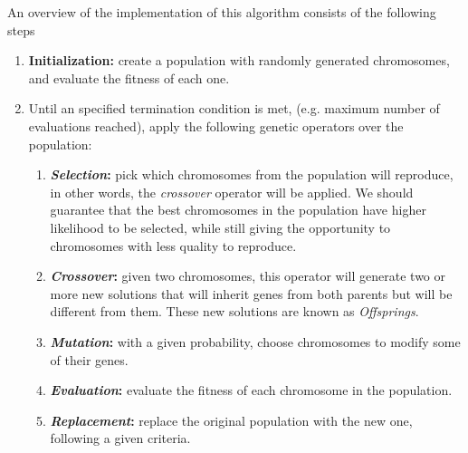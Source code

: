 An overview of the implementation of this algorithm consists of the following steps

\begin{enumerate}
    \item \textbf{Initialization:} create a population with randomly generated chromosomes, and evaluate the fitness of each one.
    
    \item Until an specified termination condition is met, (e.g. maximum number of evaluations reached), apply the following genetic operators over the population:
    
    \begin{enumerate}
        \item \textbf{\textit{Selection}:} pick which chromosomes from the population will reproduce, in other words, the \textit{crossover} operator will be applied. We should guarantee that the best chromosomes in the population have higher likelihood to be selected, while still giving the opportunity to chromosomes with less quality to reproduce.
    
        \item \textbf{\textit{Crossover}:} given two chromosomes, this operator will generate two or more new solutions that will inherit genes from both parents but will be different from them. These new solutions are known as \textit{Offsprings}.
        
        \item \textbf{\textit{Mutation}:} with a given probability, choose chromosomes to modify some of their genes.
        
        \item \textbf{\textit{Evaluation}:} evaluate the fitness of each chromosome in the population.
        
        \item \textbf{\textit{Replacement}:} replace the original population with the new one, following a given criteria. 
        
    \end{enumerate}     
\end{enumerate}

